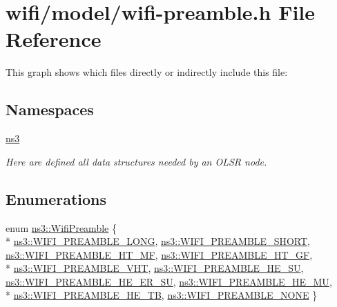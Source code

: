 \hypertarget{wifi-preamble_8h}{}\section{wifi/model/wifi-\/preamble.h File Reference}
\label{wifi-preamble_8h}
This graph shows which files directly or indirectly include this file\+:
\subsection*{Namespaces}
\begin{DoxyCompactItemize}
\item 
 \hyperlink{namespacens3}{ns3}
\begin{DoxyCompactList}\small\item\em Here are defined all data structures needed by an O\+L\+SR node. \end{DoxyCompactList}\end{DoxyCompactItemize}
\subsection*{Enumerations}
\begin{DoxyCompactItemize}
\item 
enum \hyperlink{group__wifi_ga5e94a56cb338a14ffbbb19c6a41251eb}{ns3\+::\+Wifi\+Preamble} \{ \\*
\hyperlink{group__wifi_gga5e94a56cb338a14ffbbb19c6a41251eba12f3d9468d1630bd38bbef20df1e3eda}{ns3\+::\+W\+I\+F\+I\+\_\+\+P\+R\+E\+A\+M\+B\+L\+E\+\_\+\+L\+O\+NG}, 
\hyperlink{group__wifi_gga5e94a56cb338a14ffbbb19c6a41251ebab9a39ca1f62d36c33ac489c4cf59745b}{ns3\+::\+W\+I\+F\+I\+\_\+\+P\+R\+E\+A\+M\+B\+L\+E\+\_\+\+S\+H\+O\+RT}, 
\hyperlink{group__wifi_gga5e94a56cb338a14ffbbb19c6a41251ebae0944a664debb28943c12d4cd7a81d2a}{ns3\+::\+W\+I\+F\+I\+\_\+\+P\+R\+E\+A\+M\+B\+L\+E\+\_\+\+H\+T\+\_\+\+MF}, 
\hyperlink{group__wifi_gga5e94a56cb338a14ffbbb19c6a41251eba82e0b00d79c1f01b7a6e46b693bafd72}{ns3\+::\+W\+I\+F\+I\+\_\+\+P\+R\+E\+A\+M\+B\+L\+E\+\_\+\+H\+T\+\_\+\+GF}, 
\\*
\hyperlink{group__wifi_gga5e94a56cb338a14ffbbb19c6a41251ebab90b0fe0b17f27e51c0fe16239e7b089}{ns3\+::\+W\+I\+F\+I\+\_\+\+P\+R\+E\+A\+M\+B\+L\+E\+\_\+\+V\+HT}, 
\hyperlink{group__wifi_gga5e94a56cb338a14ffbbb19c6a41251eba99c3e12c6e91fc9a9bee491d20dab807}{ns3\+::\+W\+I\+F\+I\+\_\+\+P\+R\+E\+A\+M\+B\+L\+E\+\_\+\+H\+E\+\_\+\+SU}, 
\hyperlink{group__wifi_gga5e94a56cb338a14ffbbb19c6a41251eba8564a338f16f8d1f6b570a959c1828ad}{ns3\+::\+W\+I\+F\+I\+\_\+\+P\+R\+E\+A\+M\+B\+L\+E\+\_\+\+H\+E\+\_\+\+E\+R\+\_\+\+SU}, 
\hyperlink{group__wifi_gga5e94a56cb338a14ffbbb19c6a41251eba96235025188915f1c99f4384a08828b7}{ns3\+::\+W\+I\+F\+I\+\_\+\+P\+R\+E\+A\+M\+B\+L\+E\+\_\+\+H\+E\+\_\+\+MU}, 
\\*
\hyperlink{group__wifi_gga5e94a56cb338a14ffbbb19c6a41251eba874c80edd8f0bdf17c5cd247ee645940}{ns3\+::\+W\+I\+F\+I\+\_\+\+P\+R\+E\+A\+M\+B\+L\+E\+\_\+\+H\+E\+\_\+\+TB}, 
\hyperlink{group__wifi_gga5e94a56cb338a14ffbbb19c6a41251eba97c5c71995de5f28931200e6d5a38a66}{ns3\+::\+W\+I\+F\+I\+\_\+\+P\+R\+E\+A\+M\+B\+L\+E\+\_\+\+N\+O\+NE}
 \}
\end{DoxyCompactItemize}
